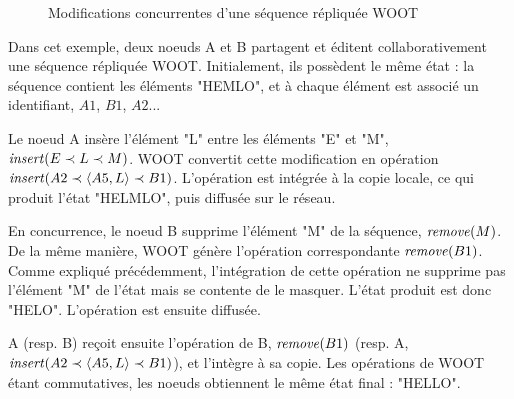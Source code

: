 \begin{figure}[!ht]
{
  }
  \caption{Modifications concurrentes d'une séquence répliquée WOOT}
  \label{fig:woot}
\end{figure}

Dans cet exemple, deux noeuds A et B partagent et éditent collaborativement une séquence répliquée WOOT.
Initialement, ils possèdent le même état : la séquence contient les éléments "HEMLO", et à chaque élément est associé un identifiant, \eg $A1$, $B1$, $A2$...

Le noeud A insère l'élément "L" entre les éléments "E" et "M", \ie $\mathit{insert}(E \prec L \prec M)$.
WOOT convertit cette modification en opération $\mathit{insert}(A2 \prec \langle A5,L \rangle \prec B1)$.
L'opération est intégrée à la copie locale, ce qui produit l'état "HELMLO", puis diffusée sur le réseau.

En concurrence, le noeud B supprime l'élément "M" de la séquence, \ie $\mathit{remove}(M)$.
De la même manière, WOOT génère l'opération correspondante $\mathit{remove}(B1)$.
Comme expliqué précédemment, l'intégration de cette opération ne supprime pas l'élément "M" de l'état mais se contente de le masquer.
L'état produit est donc "HELO".
L'opération est ensuite diffusée.

A (resp. B) reçoit ensuite l'opération de B, $\mathit{remove}(B1)$ (resp. A, $\mathit{insert}(A2 \prec \langle A5,L \rangle \prec B1)$), et l'intègre à sa copie.
Les opérations de WOOT étant commutatives, les noeuds obtiennent le même état final : "HELLO".

